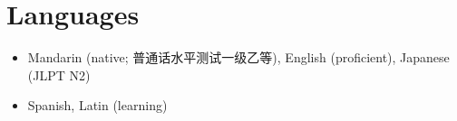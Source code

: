 \documentclass[10pt]{article}
\newenvironment{largefont}{\large}{\normalsize}
\begin{document}
\section*{Languages}
\begin{itemize}
    \item Mandarin (native; 普通话水平测试一级乙等), English (proficient), Japanese (JLPT N2)
    \item Spanish, Latin (learning)
\end{itemize}


    
\end{document}
